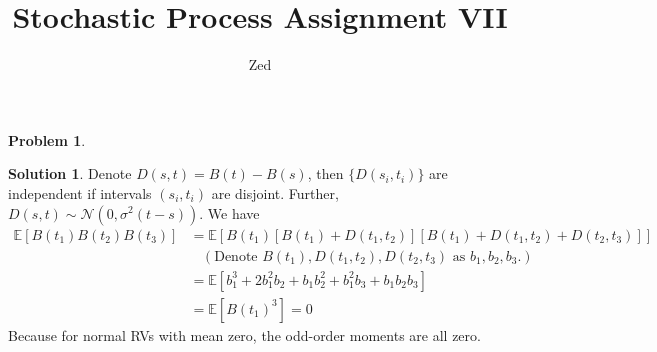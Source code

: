 \documentclass[a4paper, 10pt]{article}
\title{\textbf{Stochastic Process Assignment VII}}
\author{Zed}
\theoremstyle{definition}
\newtheorem{problem}{Problem}
\theoremstyle{hSol}
\newtheorem*{solution}{Solution}
\begin{document}
\maketitle

\begin{problem} 
\end{problem}
\begin{solution} Denote $D(s,t)=B(t)-B(s)$, then $\{D(s_i, t_i)\}$ are independent if intervals $(s_i, t_i)$ are disjoint. Further, $D(s,t)\sim \mathcal{N}(0, \sigma^2(t-s))$. We have
\begin{equation}
  \begin{split}
    \mathbb{E}\left[B(t_1)B(t_2)B(t_3)\right] &= \mathbb{E}\left[B(t_1)[B(t_1)+D(t_1, t_2)][B(t_1)+D(t_1, t_2)+D(t_2,t_3)]\right] \\
    &~~~~(\text{Denote $B(t_1), D(t_1, t_2), D(t_2,t_3)$ as $b_1, b_2, b_3$.})\\
    &= \mathbb{E}\left[b_1^3 + 2b_1^2b_2 + b_1b_2^2+b_1^2b_3+b_1b_2b_3\right]\\
    &= \mathbb{E}\left[B(t_1)^3\right] = 0
  \end{split}
\end{equation}
Because for normal RVs with mean zero, the odd-order moments are all zero.
\end{solution}
\end{document}
